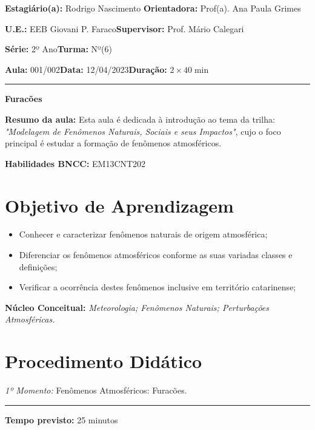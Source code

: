 \par\noindent\textbf{Estagiário(a):} Rodrigo Nascimento \hfill{}\textbf{Orientadora:} Prof(a). Ana Paula Grimes
\par\noindent\textbf{U.E.:} EEB Giovani P. Faraco\hfill{}\textbf{Supervisor:} Prof. Mário Calegari
\par\noindent\textbf{Série:} 2º Ano\hfill{}\textbf{Turma:} Nº(6)
\par\noindent\textbf{Aula:} 001/002\hfill{}\textbf{Data:} 12/04/2023\hfill{}\textbf{Duração:} $2\times 40\min$
\rule{\textwidth}{.5pt}
\bigskip{}  
\noindent
\begin{center}
	\textbf{Furacões}
\end{center}
\par\noindent\textbf{Resumo da aula:} Esta aula é dedicada à introdução ao tema da trilha: \textit{"Modelagem de Fenômenos Naturais, Sociais e seus Impactos"}, cujo o foco principal é estudar a formação de fenômenos atmosféricos.
\par\noindent\textbf{Habilidades BNCC:} EM13CNT202

\section*{Objetivo de Aprendizagem}
\begin{itemize}
	\item Conhecer e caracterizar fenômenos naturais de origem atmosférica;
	\item Diferenciar os fenômenos atmosféricos conforme as suas variadas classes e definições;
	\item Verificar a ocorrência destes fenômenos inclusive em território catarinense;
\end{itemize}

\medskip{}

\noindent\textbf{Núcleo Conceitual:} \emph{Meteorologia; Fenômenos Naturais; Perturbações Atmosféricas.}
\newpage

\section*{Procedimento Didático} 
\noindent\emph{1º Momento:} Fenômenos Atmosféricos: Furacões.
\par\noindent\rule{.3\textwidth}{.5pt}  
\par\noindent\textbf{Tempo previsto:} 25 minutos

